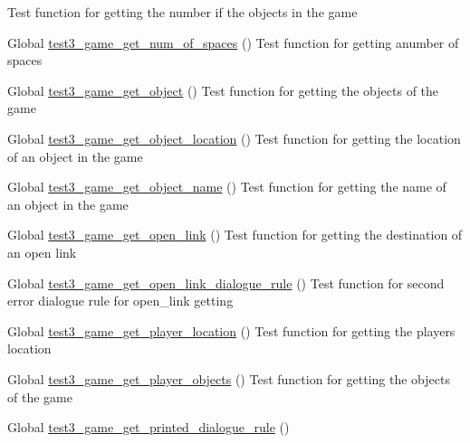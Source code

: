 \begin{DoxyRefList}
%
Test function for getting the number if the objects in the game  
\item[Global \mbox{\hyperlink{game__test_8c_ad49801eefded9a4134d3ab6ea9aa5eb2}{test3\+\_\+game\+\_\+get\+\_\+num\+\_\+of\+\_\+spaces}} ()]\label{test__test000223}%
%
Test function for getting anumber of spaces  
\item[Global \mbox{\hyperlink{game__test_8c_a8eedc20b062e8696033f57c87ad5cc94}{test3\+\_\+game\+\_\+get\+\_\+object}} ()]\label{test__test000186}%
%
Test function for getting the objects of the game  
\item[Global \mbox{\hyperlink{game__test_8c_ad415eade4b86f3d21cd9724add64478d}{test3\+\_\+game\+\_\+get\+\_\+object\+\_\+location}} ()]\label{test__test000204}%
%
Test function for getting the location of an object in the game  
\item[Global \mbox{\hyperlink{game__test_8c_a8f2992e01f5fcf53c8311a1196df47c2}{test3\+\_\+game\+\_\+get\+\_\+object\+\_\+name}} ()]\label{test__test000200}%
%
Test function for getting the name of an object in the game  
\item[Global \mbox{\hyperlink{game__test_8c_a2ebacb9dc048fe87098212a8409bcfda}{test3\+\_\+game\+\_\+get\+\_\+open\+\_\+link}} ()]\label{test__test000263}%
%
Test function for getting the destination of an open link  
\item[Global \mbox{\hyperlink{game__test_8c_a22e8048c1137de8ee4ff2a2290b0c523}{test3\+\_\+game\+\_\+get\+\_\+open\+\_\+link\+\_\+dialogue\+\_\+rule}} ()]\label{test__test000369}%
%
Test function for second error dialogue rule for open\+\_\+link getting  
\item[Global \mbox{\hyperlink{game__test_8c_a9d0c7fc422fb9113b08cb8cfbeed3842}{test3\+\_\+game\+\_\+get\+\_\+player\+\_\+location}} ()]\label{test__test000161}%
%
Test function for getting the player\textquotesingle{}s location  
\item[Global \mbox{\hyperlink{game__test_8c_a1e99c75bae9897f8e98729894a61eeea}{test3\+\_\+game\+\_\+get\+\_\+player\+\_\+objects}} ()]\label{test__test000158}%
%
Test function for getting the objects of the game  
\item[Global \mbox{\hyperlink{game__test_8c_afe71d0d357d7659fe5daa4c5f1e5827c}{test3\+\_\+game\+\_\+get\+\_\+printed\+\_\+dialogue\+\_\+rule}} ()]\label{test__test000313}%

\end{DoxyRefList}
